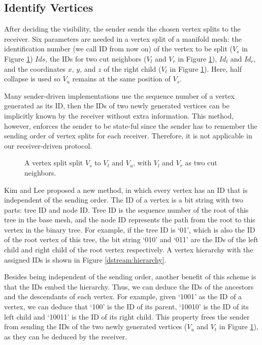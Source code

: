     \subsection{Identify Vertices}
    After deciding the visibility, the sender sends the chosen vertex splits to the receiver.
    Six parameters are needed in a vertex split of a manifold mesh: the identification number
    (we call ID from now on) of the vertex to be split
    ($V_s$ in Figure \ref{dstream:split}) $Ids$, 
    the IDs for two cut neighbors 
    ($V_l$ and $V_r$ in Figure \ref{dstream:split}), $Id_l$ and $Id_r$,
    and the coordinates $x$, $y$, and $z$ of the right child ($V_t$ in
    Figure \ref{dstream:split}). Here, half collapse is used so $V_u$ remains at the same position
    of $V_s$. 
    
    Many sender-driven implementations use the sequence number of a vertex generated as its ID,
    then the IDs of two newly generated vertices can be implicitly known by the receiver without
    extra information. This method, however, 
    enforces the sender to be state-ful since the sender has to remember 
    the sending order of vertex splits for each receiver. 
    Therefore, it is not applicable in our receiver-driven protocol.
    \begin{figure}
    \centering
    \caption{A vertex split split $V_s$ to $V_t$ and $V_u$, with $V_l$ and $V_r$ as two cut neighbors.}
    \label{dstream:split}
    \end{figure}

    Kim and Lee \cite{kim01truly} proposed a new method, in which every vertex has
    an ID that is independent of the sending order. The ID of a vertex is a bit string
    with two parts: tree ID and node ID.
    Tree ID is the sequence number of the root of this tree in the base mesh, 
    and the node ID represents the path from the root to this vertex in the binary tree.
    For example, if the tree ID is `01', which is also the ID of
    the root vertex of this tree, the bit string `010' and `011' are the IDs
    of the left child and right child of the root vertex respectively. 
    A vertex hierarchy with the assigned IDs is shown in 
    Figure \ref{dstream:hierarchy}.

    Besides being independent of the sending order, another benefit of this scheme
    is that the IDs embed the hierarchy. Thus,  
    we can deduce the IDs of the ancestors and the descendants of each vertex. 
    For example, given `1001' as the ID of a vertex,
    we can deduce that `100' is the ID of its parent, `10010' is the ID of its left child and 
    `10011' is the ID of its right child. 
    This property frees the sender from sending the IDs of the two newly generated vertices
    ($V_u$ and $V_t$ in Figure \ref{dstream:split}), as they can be deduced by the receiver.

